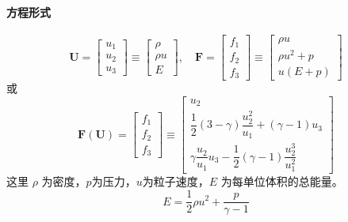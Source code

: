 \documentclass{article}
\numberwithin{equation}{subsection}    %
\begin{document}
\begin{appendix}
    \paragraph{方程形式}
    \begin{equation}
        \mathbf{U}=\left[\begin{array}{l}
                u_{1} \\
                u_{2} \\
                u_{3}
            \end{array}\right] \equiv\left[\begin{array}{c}
                \rho   \\
                \rho u \\
                E
            \end{array}\right], \quad \mathbf{F}=\left[\begin{array}{c}
                f_{1} \\
                f_{2} \\
                f_{3}
            \end{array}\right] \equiv\left[\begin{array}{c}
                \rho u       \\
                \rho u^{2}+p \\
                u(E+p)
            \end{array}\right]
    \end{equation}
    或
    \begin{equation}
        \mathbf{F}(\mathbf{U})=\left[\begin{array}{l}
                f_{1} \\
                f_{2} \\
                f_{3}
            \end{array}\right] \equiv\left[\begin{array}{c}
                u_{2}                                                            \\
                \dfrac{1}{2}(3-\gamma) \dfrac{u_{2}^{2}}{u_{1}}+(\gamma-1) u_{3} \\
                \gamma \dfrac{u_{2}}{u_{1}} u_{3}-\dfrac{1}{2}(\gamma-1) \dfrac{u_{2}^{3}}{u_{1}^{2}}
            \end{array}\right]
    \end{equation}
    这里 $\rho$ 为密度，$p$为压力，$u$为粒子速度，$E$ 为每单位体积的总能量。
    \begin{equation}
        E=\dfrac{1}{2}\rho u^{2}+\frac{p}{\gamma-1}
    \end{equation}


\end{appendix}
\end{document}
